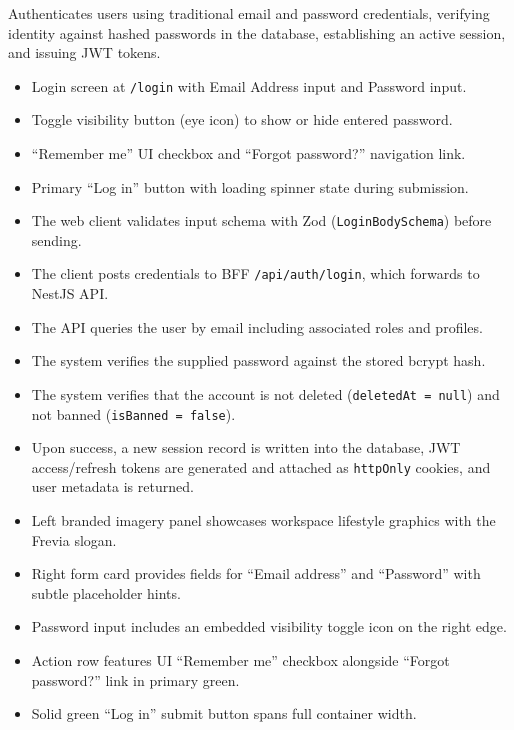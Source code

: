 \noindent Authenticates users using traditional email and password credentials, verifying identity against hashed passwords in the database, establishing an active session, and issuing JWT tokens.

\begin{itemize}[leftmargin=1.6em,topsep=3pt,itemsep=2pt,parsep=0pt,label=$\bullet$]
    \item Login screen at \texttt{/login} with Email Address input and Password input.
    \item Toggle visibility button (eye icon) to show or hide entered password.
    \item ``Remember me'' UI checkbox and ``Forgot password?'' navigation link.
    \item Primary ``Log in'' button with loading spinner state during submission.
\end{itemize}

\begin{itemize}[leftmargin=1.6em,topsep=3pt,itemsep=2pt,parsep=0pt,label=$\bullet$]
    \item The web client validates input schema with Zod (\texttt{LoginBodySchema}) before sending.
    \item The client posts credentials to BFF \texttt{/api/auth/login}, which forwards to NestJS API.
    \item The API queries the user by email including associated roles and profiles.
    \item The system verifies the supplied password against the stored bcrypt hash.
    \item The system verifies that the account is not deleted (\texttt{deletedAt = null}) and not banned (\texttt{isBanned = false}).
    \item Upon success, a new session record is written into the database, JWT access/refresh tokens are generated and attached as \texttt{httpOnly} cookies, and user metadata is returned.
\end{itemize}

\begin{itemize}[leftmargin=1.6em,topsep=3pt,itemsep=2pt,parsep=0pt,label=$\bullet$]
    \item Left branded imagery panel showcases workspace lifestyle graphics with the Frevia slogan.
    \item Right form card provides fields for ``Email address'' and ``Password'' with subtle placeholder hints.
    \item Password input includes an embedded visibility toggle icon on the right edge.
    \item Action row features UI ``Remember me'' checkbox alongside ``Forgot password?'' link in primary green.
    \item Solid green ``Log in'' submit button spans full container width.
\end{itemize}

